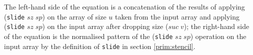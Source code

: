 \documentclass{l4proj}
\begin{document}
\begin{code}
\AgdaSymbol{))}\AgdaSpace{}%
\AgdaOperator{\AgdaPrimitive{*}}\AgdaSpace{}%
\AgdaSpace{}%
\AgdaSymbol{)\}}\<%
\\
%
\>[15]\AgdaSymbol{(}\AgdaSpace{}%
\AgdaSymbol{(}\AgdaSpace{}%
\AgdaSpace{}%
\AgdaSymbol{(}\AgdaSpace{}%
\AgdaSymbol{)}\AgdaSpace{}%
\AgdaSpace{}%
\AgdaSymbol{)}\AgdaSpace{}%
\AgdaSymbol{)}\AgdaSpace{}%
\<%
\\
%
\>[15]\AgdaSpace{}%
\AgdaSymbol{\{}\AgdaSpace{}%
\AgdaOperator{\AgdaPrimitive{+}}\AgdaSpace{}%
\AgdaSymbol{(}\AgdaSpace{}%
\AgdaOperator{\AgdaPrimitive{+}}\AgdaSpace{}%
\AgdaSpace{}%
\AgdaOperator{\AgdaPrimitive{*}}\AgdaSpace{}%
\AgdaSpace{}%
\AgdaSymbol{)\}}\AgdaSpace{}%
\AgdaSpace{}%
\<%
\\
%
\>[15]\AgdaSymbol{(}\AgdaSpace{}%
\AgdaSymbol{(}\AgdaSpace{}%
\AgdaSymbol{)}\AgdaSpace{}%
\AgdaSymbol{\{}\AgdaSpace{}%
\AgdaOperator{\AgdaPrimitive{+}}\AgdaSpace{}%
\AgdaSymbol{(}\AgdaSpace{}%
\AgdaOperator{\AgdaPrimitive{+}}\AgdaSpace{}%
\AgdaSymbol{(}\AgdaSpace{}%
\AgdaOperator{\AgdaPrimitive{+}}\AgdaSpace{}%
\AgdaSpace{}%
\AgdaOperator{\AgdaPrimitive{*}}\AgdaSpace{}%
\AgdaSpace{}%
\AgdaSymbol{))}\AgdaSpace{}%
\AgdaOperator{\AgdaPrimitive{*}}\AgdaSpace{}%
\AgdaSpace{}%
\AgdaSymbol{\}}\<%
\\
%
\>[15]\AgdaSymbol{(}\AgdaSpace{}%
\AgdaSymbol{(}\AgdaSpace{}%
\AgdaSymbol{(}\AgdaSpace{}%
\AgdaOperator{\AgdaPrimitive{+}}\AgdaSpace{}%
\AgdaSymbol{(}\AgdaSpace{}%
\AgdaOperator{\AgdaPrimitive{+}}\AgdaSpace{}%
\AgdaSpace{}%
\AgdaOperator{\AgdaPrimitive{*}}\AgdaSpace{}%
\AgdaSpace{}%
\AgdaSymbol{))}\AgdaSpace{}%
\AgdaSpace{}%
\AgdaSpace{}%
\AgdaSymbol{)}\<%
\\
%
\>[15]\AgdaSymbol{(}\AgdaSpace{}%
\AgdaSymbol{(}\AgdaSpace{}%
\AgdaSpace{}%
\AgdaSymbol{(}\AgdaSpace{}%
\AgdaSymbol{)}\AgdaSpace{}%
\AgdaSpace{}%
\AgdaSymbol{)}\AgdaSpace{}%
\AgdaSymbol{)))}\<%
\end{code}
The left-hand side of the equation is a concatenation of the results of applying (\texttt{slide} $sz\; sp$) on the array of size $u$ taken from the input array and applying (\texttt{slide} $sz\; sp$) on the input array after dropping size ($suc\; v$); the right-hand side of the equation is the normalised pattern of the (\texttt{slide} $sz\; sp$) operation on the input array by the definition of \texttt{slide} in section \ref{prim:stencil}. 
\end{document}

